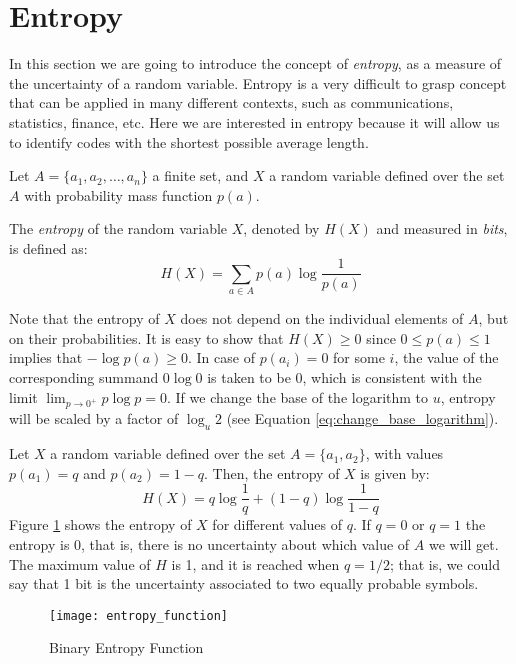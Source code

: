 %
%

\section{Entropy}
\label{sec:Entropy}

In this section we are going to introduce the concept of \emph{entropy}, as a measure of the uncertainty of a random variable. Entropy is a very difficult to grasp concept that can be applied in many different contexts, such as communications, statistics, finance, etc. Here we are interested in entropy because it will allow us to identify codes with the shortest possible average length.

Let $A = \{a_1, a_2, \ldots, a_n\}$ a finite set, and $X$ a random variable defined over the set $A$ with probability mass function $p(a)$.

\begin{definition}[Entropy]
The \emph{entropy} of the random variable $X$, denoted by $H(X)$ and measured in \emph{bits}, is defined as:
\[
H(X) = \sum_{a \in A} p(a) \log \frac{1}{p(a)}
\]
\end{definition}

Note that the entropy of $X$ does not depend on the individual elements of $A$, but on their probabilities. It is easy to show that $H(X) \geq 0$ since $0 \leq p(a) \leq 1$ implies that $-\log p(a) \geq 0$. In case of $p(a_i) = 0$ for some $i$, the value of the corresponding summand $0 \log 0$ is taken to be $0$, which is consistent with the limit $\lim_{p\to 0^+} p \log p = 0$. If we change the base of the logarithm to $u$, entropy will be scaled by a factor of $\log_u 2$ (see Equation \ref{eq:change_base_logarithm}).

\begin{example}
Let $X$ a random variable defined over the set $A = \{a_1, a_2\}$, with values $p(a_1) = q$ and $p(a_2) = 1-q$. Then, the entropy of $X$ is given by:
\[
H(X) = q \log \frac{1}{q} + (1-q) \log \frac{1}{1-q}
\]
Figure \ref{fig:entropy_function} shows the entropy of $X$ for different values of $q$. If $q=0$ or $q=1$ the entropy is 0, that is, there is no uncertainty about which value of $A$ we will get. The maximum value of $H$ is 1, and it is reached when $q=1/2$; that is, we could say that 1 bit is the uncertainty associated to two equally probable symbols.
\end{example}

\begin{figure}[h]
\centering\texttt{[image: entropy\_function]}
\caption{\label{fig:entropy_function}Binary Entropy Function}
\end{figure}

